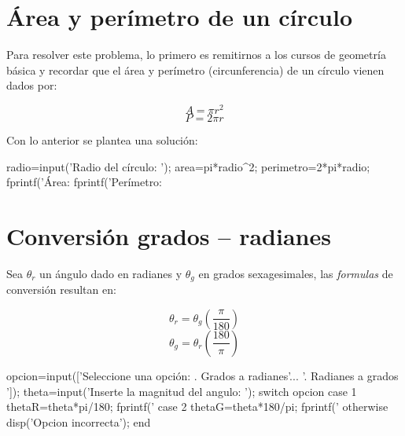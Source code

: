 
\section{Área y perímetro de un círculo}


\sol

Para resolver este problema, lo primero es remitirnos a los cursos de geometría básica y recordar 
que el área y perímetro (circunferencia) de un círculo vienen dados por:

$$A=\pi r^2$$
$$P=2 \pi r$$

Con lo anterior se plantea una solución:

\begin{matlab}
radio=input('Radio del círculo: ');
area=pi*radio^2;
perimetro=2*pi*radio;
fprintf('Área: %
fprintf('Perímetro: %
\end{matlab}


\section{Conversión grados – radianes}


\sol

Sea $\theta_r$ un ángulo dado en radianes y $\theta_g$ en grados sexagesimales, las {\it formulas} de 
conversión resultan en:

$$\theta_r = \theta_g \left(\frac{\pi}{180}\right)$$
$$\theta_g = \theta_r \left(\frac{180}{\pi}\right)$$

\begin{matlab}
opcion=input(['Seleccione una opción: . Grados a radianes'...
'. Radianes a grados \n']);
theta=input('Inserte la magnitud del angulo: ');
switch opcion
    case 1
        thetaR=theta*pi/180;
        fprintf('%
    case 2
        thetaG=theta*180/pi;
        fprintf('%
    otherwise
        disp('Opcion incorrecta');
end
\end{matlab}


